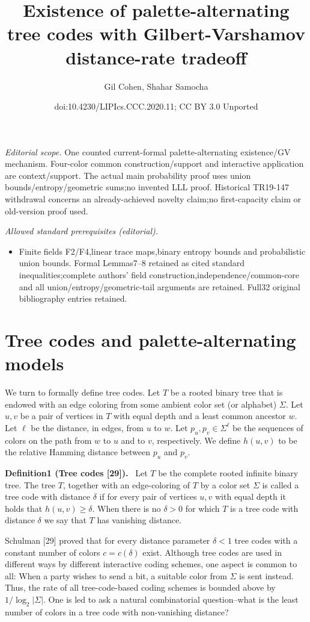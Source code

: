 \documentclass[10pt,a4paper]{article}
\title{Existence of palette-alternating tree codes with Gilbert-Varshamov distance-rate tradeoff}
\author{Gil Cohen, Shahar Samocha}
\date{doi:10.4230/LIPIcs.CCC.2020.11; CC BY 3.0 Unported}
\newenvironment{authorclaim}[1]{\par\medskip\noindent\textbf{#1.}\ \ignorespaces}{\par\medskip}
\begin{document}
\maketitle
\noindent\textit{Editorial scope.} One counted current-formal palette-alternating existence/GV mechanism. Four-color common construction/support and interactive application are context/support. The actual main probability proof uses union bounds/entropy/geometric sums;no invented LLL proof. Historical TR19-147 withdrawal concerns an already-achieved novelty claim;no first-capacity claim or old-version proof used.\par\medskip
\noindent\textit{Allowed standard prerequisites (editorial).}\begin{itemize}
\item Finite fields F2/F4,linear trace maps,binary entropy bounds and probabilistic union bounds. Formal Lemmas7–8 retained as cited standard inequalities;complete authors' field construction,independence/common-core and all union/entropy/geometric-tail arguments are retained. Full32 original bibliography entries retained.
\end{itemize}\medskip
\section*{Tree codes and palette-alternating models}
We turn to formally define tree codes. Let $T$ be a rooted binary tree that is endowed with an edge coloring from some ambient color set (or alphabet) $\Sigma$. Let $u,v$ be a pair of vertices in $T$ with equal depth and a least common ancestor $w$. Let $\ell$ be the distance, in edges, from $u$ to $w$. Let $p_u,p_v\in\Sigma^\ell$ be the sequences of colors on the path from $w$ to $u$ and to $v$, respectively. We define $h(u,v)$ to be the relative Hamming distance between $p_u$ and $p_v$.
\begin{authorclaim}{Definition1 (Tree codes [29])}
Let $T$ be the complete rooted infinite binary tree. The tree $T$, together with an edge-coloring of $T$ by a color set $\Sigma$ is called a tree code with distance $\delta$ if for every pair of vertices $u,v$ with equal depth it holds that $h(u,v)\ge\delta$. When there is no $\delta>0$ for which $T$ is a tree code with distance $\delta$ we say that $T$ has vanishing distance.
\end{authorclaim}
Schulman [29] proved that for every distance parameter $\delta<1$ tree codes with a constant number of colors $c=c(\delta)$ exist. Although tree codes are used in different ways by different interactive coding schemes, one aspect is common to all: When a party wishes to send a bit, a suitable color from $\Sigma$ is sent instead. Thus, the rate of all tree-code-based coding schemes is bounded above by $1/\log_2|\Sigma|$. One is led to ask a natural combinatorial question--what is the least number of colors in a tree code with non-vanishing distance?
\end{document}
